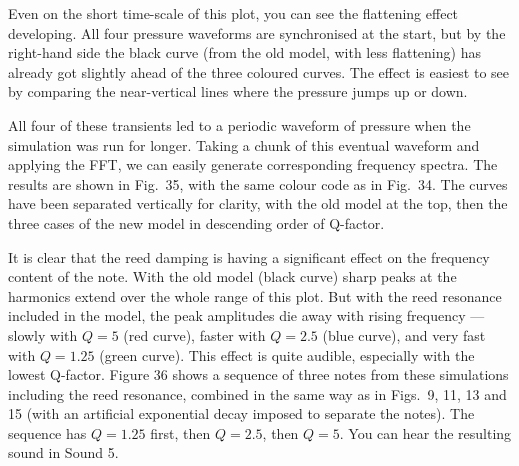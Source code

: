   Even on the short time-scale of this plot, you can see the flattening effect 
  developing. All four pressure waveforms are synchronised at the start, but by 
  the right-hand side the black curve (from the old model, with less 
  flattening) has already got slightly ahead of the three coloured curves. The 
  effect is easiest to see by comparing the near-vertical lines where the 
  pressure jumps up or down. 

  All four of these transients led to a periodic waveform of pressure when the 
  simulation was run for longer. Taking a chunk of this eventual waveform and 
  applying the FFT, we can easily generate corresponding frequency spectra. The 
  results are shown in Fig.\ 35, with the same colour code as in Fig.\ 34. The 
  curves have been separated vertically for clarity, with the old model at the 
  top, then the three cases of the new model in descending order of Q-factor. 


  It is clear that the reed damping is having a significant effect on the 
  frequency content of the note. With the old model (black curve) sharp peaks 
  at the harmonics extend over the whole range of this plot. But with the reed 
  resonance included in the model, the peak amplitudes die away with rising 
  frequency — slowly with $Q=5$ (red curve), faster with $Q=2.5$ (blue curve), 
  and very fast with $Q=1.25$ (green curve). This effect is quite audible, 
  especially with the lowest Q-factor. Figure 36 shows a sequence of three 
  notes from these simulations including the reed resonance, combined in the 
  same way as in Figs.\ 9, 11, 13 and 15 (with an artificial exponential decay 
  imposed to separate the notes). The sequence has $Q=1.25$ first, then 
  $Q=2.5$, then $Q=5$. You can hear the resulting sound in Sound 5. 


